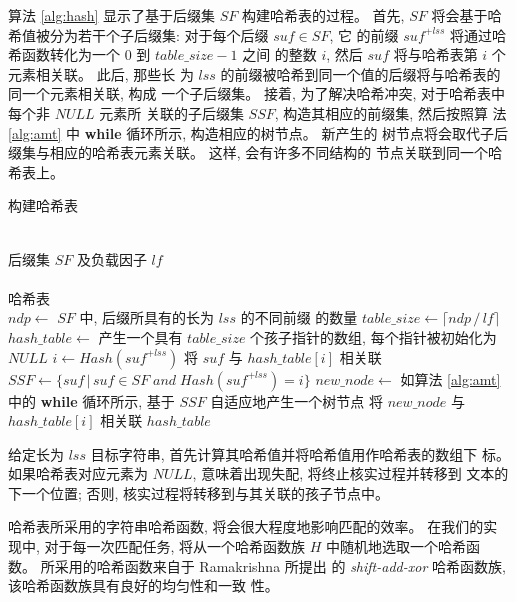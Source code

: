 算法 \ref{alg:hash} 显示了基于后缀集 $SF$ 构建哈希表的过程。  首先,
$SF$ 将会基于哈希值被分为若干个子后缀集: 对于每个后缀 $suf \in SF$, 它
的前缀 $suf^{+lss}$ 将通过哈希函数转化为一个 0 到 $table\_size-1$ 之间
的整数 $i$, 然后 $suf$ 将与哈希表第 $i$ 个元素相关联。 此后, 那些长
为 $lss$ 的前缀被哈希到同一个值的后缀将与哈希表的同一个元素相关联, 构成
一个子后缀集。 接着, 为了解决哈希冲突, 对于哈希表中每个非 $NULL$ 元素所
关联的子后缀集 $SSF$, 构造其相应的前缀集, 然后按照算
法 \ref{alg:amt} 中 \textbf{while} 循环所示, 构造相应的树节点。 新产生的
树节点将会取代子后缀集与相应的哈希表元素关联。 这样, 会有许多不同结构的
节点关联到同一个哈希表上。

\begin{algorithm}
  \caption{构建哈希表}
  \label{alg:hash}
  \begin{algorithmic}[1]
    \REQUIRE ~~\\
    后缀集 $SF$ 及负载因子 $lf$ \\
    \ENSURE ~~\\
    哈希表\\
    \STATE
    \STATE $ndp \leftarrow$ $SF$ 中, 后缀所具有的长为 $lss$ 的不同前缀
    的数量
    \STATE $table\_size \leftarrow \lceil ndp\,/\,lf \rceil$
    \STATE $hash\_table \leftarrow$ 产生一个具有
    $table\_size$ 个孩子指针的数组, 每个指针被初始化为 $NULL$
    \STATE
    \STATE $i \leftarrow Hash(suf^{+lss})$
    \STATE 将 $suf$ 与 $hash\_table[i]$ 相关联
    \ENDFOR
    \STATE
    \STATE $SSF \leftarrow \{suf\,|\,suf\in SF\; and\; Hash(suf^{+lss})=i\}$
    \STATE $new\_node \leftarrow$ 如算法 \ref{alg:amt} 中的
    \textbf{while} 循环所示, 基于 $SSF$ 自适应地产生一个树节点
    \STATE 将 $new\_node$ 与 $hash\_table[i]$ 相关联
    \ENDIF
    \ENDFOR
    \STATE
    \RETURN $hash\_table$
  \end{algorithmic}
\end{algorithm}

给定长为 $lss$ 目标字符串, 首先计算其哈希值并将哈希值用作哈希表的数组下
标。 如果哈希表对应元素为 $NULL$, 意味着出现失配, 将终止核实过程并转移到
文本的下一个位置; 否则, 核实过程将转移到与其关联的孩子节点中。

哈希表所采用的字符串哈希函数, 将会很大程度地影响匹配的效率。 在我们的实
现中, 对于每一次匹配任务, 将从一个哈希函数族 $H$ 中随机地选取一个哈希函
数。 所采用的哈希函数来自于 Ramakrishna \cite{Ramakrishna1997} 所提出
的 \emph{shift-add-xor} 哈希函数族, 该哈希函数族具有良好的均匀性和一致
性。

